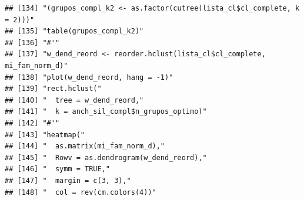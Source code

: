 \documentclass[11pt,]{article}
\begin{document}
\begin{verbatim}
## [134] "(grupos_compl_k2 <- as.factor(cutree(lista_cl$cl_complete, k = 2)))"                                                                                                   
## [135] "table(grupos_compl_k2)"                                                                                                                                                
## [136] "#'"                                                                                                                                                                    
## [137] "w_dend_reord <- reorder.hclust(lista_cl$cl_complete, mi_fam_norm_d)"                                                                                                   
## [138] "plot(w_dend_reord, hang = -1)"                                                                                                                                         
## [139] "rect.hclust("                                                                                                                                                          
## [140] "  tree = w_dend_reord,"                                                                                                                                                
## [141] "  k = anch_sil_compl$n_grupos_optimo)"                                                                                                                                 
## [142] "#'"                                                                                                                                                                    
## [143] "heatmap("                                                                                                                                                              
## [144] "  as.matrix(mi_fam_norm_d),"                                                                                                                                           
## [145] "  Rowv = as.dendrogram(w_dend_reord),"                                                                                                                                 
## [146] "  symm = TRUE,"                                                                                                                                                        
## [147] "  margin = c(3, 3),"                                                                                                                                                   
## [148] "  col = rev(cm.colors(4))"                                                                                                                                             

\end{verbatim}
\end{document}
